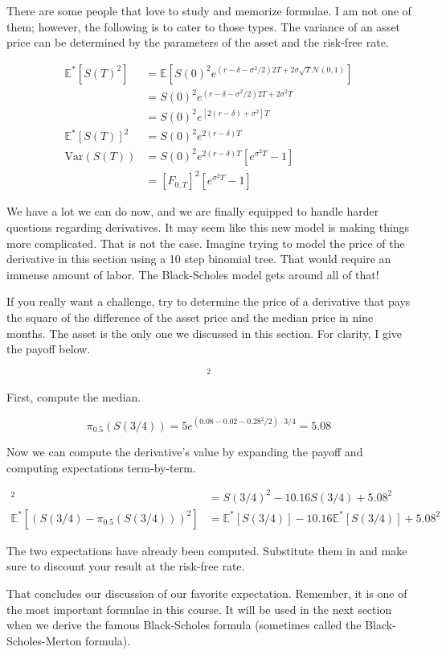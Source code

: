 \documentclass{ximera}
\begin{document}
There are some people that love to study and memorize formulae. I am not one of them; however, the following is to cater to those types. The variance of an asset price can be determined by the parameters of the asset and the risk-free rate.

\begin{align*}
\mathbb{E}^*[S(T)^2] 		&=\mathbb{E}[S(0)^2e^{(r-\delta-\sigma^2/2)2T+2\sigma\sqrt{T}\mathcal{N}(0,1)}]\\
					&=S(0)^2e^{(r-\delta-\sigma^2/2)2T+2\sigma^2T}\\
					&=S(0)^2e^{[2(r-\delta)+\sigma^2]T}\\
\mathbb{E}^*[S(T)]^2 		&=S(0)^2e^{2(r-\delta)T}\\
\text{Var}(S(T)) 			&=S(0)^2e^{2(r-\delta)T}[e^{\sigma^2T}-1]\\
					&=[F_{0,T}]^2[e^{\sigma^2T}-1]
\end{align*}

We have a lot we can do now, and we are finally equipped to handle harder questions regarding derivatives. It may seem like this new model is making things more complicated. That is not the case. Imagine trying to model the price of the derivative in this section using a 10 step binomial tree. That would require an immense amount of labor. The Black-Scholes model gets around all of that!

If you really want a challenge, try to determine the price of a derivative that pays the square of the difference of the asset price and the median price in nine months. The asset is the only one we discussed in this section. For clarity, I give the payoff below.

\begin{equation*}
[S(3/4)-\pi_{0.5}(S(3/4))]^2
\end{equation*}

\begin{solution}
First, compute the median.

	\begin{equation*}
	\pi_{0.5}(S(3/4))=5e^{(0.08-0.02-0.28^2/2)\cdot 3/4}=5.08
	\end{equation*}

Now we can compute the derivative's value by expanding the payoff and computing expectations term-by-term.

	\begin{align*}
	[S(3/4)-\pi_{0.5}(S(3/4))]^2 			&=S(3/4)^2-10.16S(3/4)+5.08^2\\
	\mathbb{E}^*[(S(3/4)-\pi_{0.5}(S(3/4)))^2] 	&=\mathbb{E}^*[S(3/4)]-10.16\mathbb{E}^*[S(3/4)]+5.08^2
	\end{align*}

The two expectations have already been computed. Substitute them in and make sure to discount your result at the risk-free rate.
\end{solution}

That concludes our discussion of our favorite expectation. Remember, it is one of the most important formulae in this course. It will be used in the next section when we derive the famous Black-Scholes formula (sometimes called the Black-Scholes-Merton formula).
\end{document}
